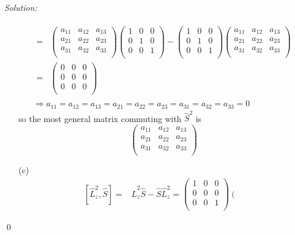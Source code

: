 \documentclass[12pt,a4paper]{article}
\newenvironment{sol}
    {\emph{Solution:}
    }
    {
    \qed
    }
\begin{document}
\begin{sol}
\begin{itemize}
\begin{gather}
\begin{align}
\nonumber=&\left(\begin{array}{ccc}
a_{11}&a_{12}&a_{13}\\
a_{21}&a_{22}&a_{23}\\
a_{31}&a_{32}&a_{33}\\
\end{array}\right)\left(\begin{array}{ccc}
1&0&0\\
0&1&0\\
0&0&1\\
\end{array}\right)-\left(\begin{array}{ccc}
1&0&0\\
0&1&0\\
0&0&1\\
\end{array}\right)\left(\begin{array}{ccc}
a_{11}&a_{12}&a_{13}\\
a_{21}&a_{22}&a_{23}\\
a_{31}&a_{32}&a_{33}\\
\end{array}\right)\\
=&\left(\begin{array}{ccc}
0&0&0\\
0&0&0\\
0&0&0\\
\end{array}\right)
\end{align}\\
\Longrightarrow a_{11}=a_{12}=a_{13}=a_{21}=a_{22}=a_{23}=a_{31}=a_{32}=a_{33}=0
\end{gather}
so the most general matrix commuting with $\hat{S}^2$ is
\begin{equation}
\left(\begin{array}{ccc}
a_{11}&a_{12}&a_{13}\\
a_{21}&a_{22}&a_{23}\\
a_{31}&a_{32}&a_{33}\\
\end{array}\right)
\end{equation}
\item[(c)]
\begin{align}
\nonumber[\hat{L}_z^2,\hat{S}]=&\hat{L}_z^2\hat{S}-\hat{S}\hat{L}_z^2=\left(\begin{array}{ccc}
1&0&0\\
0&0&0\\
0&0&1\\
\end{array}\right)\left(\begin{array}{ccc}

\end{array}
\end{align}
\end{itemize}
\end{sol}
\end{document}
